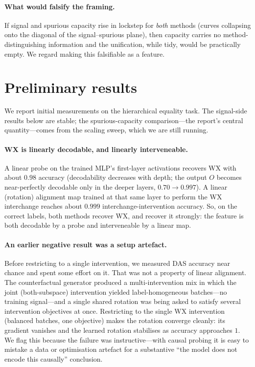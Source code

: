 \documentclass[11pt]{article}
\begin{document}
\paragraph{What would falsify the framing.} If signal and spurious capacity rise in
lockstep for \emph{both} methods (curves collapsing onto the diagonal of the
signal--spurious plane), then capacity carries no method-distinguishing
information and the unification, while tidy, would be practically empty. We regard
making this falsifiable as a feature.

\section{Preliminary results}\label{sec:results}

We report initial measurements on the hierarchical equality task. The signal-side
results below are stable; the spurious-capacity comparison---the report's central
quantity---comes from the scaling sweep, which we are still running.

\paragraph{WX is linearly decodable, and linearly interveneable.} A linear probe on
the trained MLP's first-layer activations recovers WX with about $0.98$
accuracy (decodability decreases with depth; the output $O$ becomes near-perfectly
decodable only in the deeper layers, $0.70 \to 0.997$). A linear (rotation) alignment
map trained at that same layer to perform the WX interchange reaches about
$0.999$ interchange-intervention accuracy. So, on the correct labels, both methods
recover WX, and recover it strongly: the feature is both decodable by a
probe and interveneable by a linear map.

\paragraph{An earlier negative result was a setup artefact.} Before restricting to a
single intervention, we measured DAS accuracy near chance and spent some effort on it.
That was not a property of linear alignment. The counterfactual generator produced a
multi-intervention mix in which the joint (both-subspace) intervention yielded
label-homogeneous batches---no training signal---and a single shared rotation was
being asked to satisfy several intervention objectives at once. Restricting to the
single WX intervention (balanced batches, one objective) makes the rotation
converge cleanly: its gradient vanishes and the learned rotation stabilises as accuracy
approaches $1$. We flag this because the failure was instructive---with causal probing
it is easy to mistake a data or optimisation artefact for a substantive ``the model
does not encode this causally'' conclusion.
\end{document}
